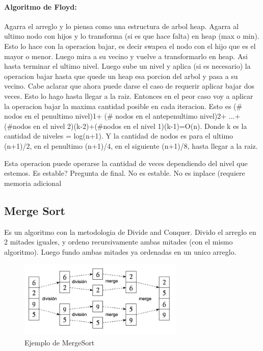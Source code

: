 \documentclass[11pt]{article}
\begin{document}
\paragraph{Algoritmo de Floyd:}
Agarra el arreglo y lo piensa como una estructura de arbol heap.
Agarra al ultimo nodo con hijos y lo transforma (si es que hace falta) en heap (max o min).
Esto lo hace con la operacion bajar, es decir swapea el nodo con el hijo que
es el mayor o menor.
Luego mira a su vecino y vuelve a transformarlo en heap.
Asi hasta terminar el ultimo nivel.
Luego sube un nivel y aplica (si es necesario) la operacion bajar
hasta que quede un heap esa porcion del arbol y pasa a su vecino.
Cabe aclarar que ahora puede darse el caso de requerir aplicar
bajar dos veces.
Esto lo hago hasta llegar a la raiz.
Entonces en el peor caso voy a aplicar la operacion bajar la maxima
cantidad posible en cada iteracion.
Esto es (\# nodos en el penultimo nivel)1+ (\# nodos en el antepenultimo nivel)2+
...+(\#nodos en el nivel 2)(k-2)+(\#nodos en el nivel 1)(k-1)=O(n).
Donde k es la cantidad de niveles = log(n+1).
Y la cantidad de nodos es para el ultimo (n+1)/2, en el penultimo
(n+1)/4, en el siguiente (n+1)/8, hasta llegar a la raiz.

Esta operacion puede operarse la cantidad de veces dependiendo del nivel que estemos.
Es estable? Pregunta de final. No es estable.
No es inplace (requiere memoria adicional

\subsection{Merge Sort}
Es un algoritmo con la metodologia de Divide and Conquer.
Divido el arreglo en 2 mitades iguales, y ordeno recursivamente
ambas mitades (con el mismo algoritmo).
Luego fundo ambas mitades ya ordenadas en un unico arreglo.

\begin{figure}[h!]
    \centering
    \includegraphics[width=0.7\textwidth]{mergesortEj.png}
    \caption{Ejemplo de MergeSort}
    \label{fig:ejMerge}
\end{figure}
\end{document}
